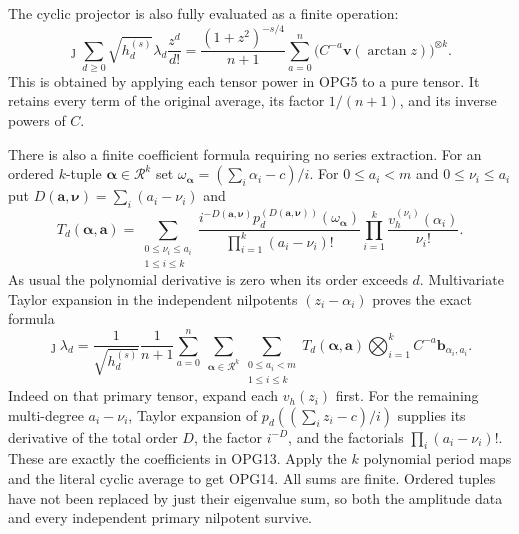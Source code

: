\documentclass[11pt,a4paper]{article}
\begin{document}
The cyclic projector is also fully evaluated as a finite operation:
\[
 \jmath\sum_{d\geq0}\sqrt{h_d^{(s)}}\lambda_d\frac{z^d}{d!}
 =\frac{(1+z^2)^{-s/4}}{n+1}
       \sum_{a=0}^{n}\bigl(C^{-a}\mathbf v(\arctan z)\bigr)^{\otimes k}.
 \tag{OPG12}
\]
This is obtained by applying each tensor power in OPG5 to a pure
tensor. It retains every term of the original average, its factor
$1/(n+1)$, and its inverse powers of $C$.

There is also a finite coefficient formula requiring no series
extraction. For an ordered $k$-tuple
$\boldsymbol\alpha\in\mathcal R^k$ set
$\omega_{\boldsymbol\alpha}=(\sum_i\alpha_i-c)/i$.
For $0\leq a_i<m$ and $0\leq\nu_i\leq a_i$ put
$D(\mathbf a,\boldsymbol\nu)=\sum_i(a_i-\nu_i)$ and
\[
 T_d(\boldsymbol\alpha,\mathbf a)=
 \sum_{\substack{0\leq\nu_i\leq a_i\\1\leq i\leq k}}
 \frac{i^{-D(\mathbf a,\boldsymbol\nu)}
        p_d^{(D(\mathbf a,\boldsymbol\nu))}(\omega_{\boldsymbol\alpha})}
        {\prod_{i=1}^k(a_i-\nu_i)!}
 \prod_{i=1}^k\frac{v_h^{(\nu_i)}(\alpha_i)}{\nu_i!}.
 \tag{OPG13}
\]
As usual the polynomial derivative is zero when its order exceeds
$d$. Multivariate Taylor expansion in the independent nilpotents
$(z_i-\alpha_i)$ proves the exact formula
\[
\boxed{
 \jmath\lambda_d=
 \frac1{\sqrt{h_d^{(s)}}}\frac1{n+1}
 \sum_{a=0}^{n}\ \sum_{\boldsymbol\alpha\in\mathcal R^k}
 \sum_{\substack{0\leq a_i<m\\1\leq i\leq k}}
 T_d(\boldsymbol\alpha,\mathbf a)
 \bigotimes_{i=1}^k C^{-a}\mathbf b_{\alpha_i,a_i}.
}\tag{OPG14}
\]
Indeed on that primary tensor, expand each $v_h(z_i)$ first.
For the remaining multi-degree $a_i-\nu_i$, Taylor expansion of
$p_d((\sum_i z_i-c)/i)$ supplies its derivative of the total
order $D$, the factor $i^{-D}$, and the factorials
$\prod_i(a_i-\nu_i)!$. These are exactly the coefficients in
OPG13. Apply the $k$ polynomial period maps and the literal cyclic
average to get OPG14. All sums are finite. Ordered tuples have
not been replaced by just their eigenvalue sum, so both the
amplitude data and every independent primary nilpotent survive.
\end{document}
